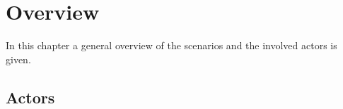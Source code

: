 %
\chapter{Overview}\label{ch:overview}

In this chapter a general overview of the scenarios and the involved actors is given.

\section{Actors} %